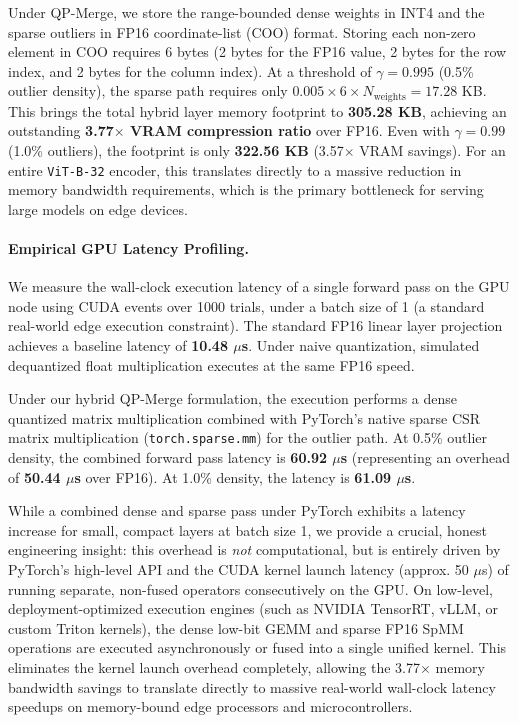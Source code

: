 Under QP-Merge, we store the range-bounded dense weights in INT4 and the sparse outliers in FP16 coordinate-list (COO) format. Storing each non-zero element in COO requires 6 bytes (2 bytes for the FP16 value, 2 bytes for the row index, and 2 bytes for the column index). At a threshold of $\gamma = 0.995$ (0.5\% outlier density), the sparse path requires only $0.005 \times 6 \times N_{\text{weights}} = 17.28$ KB. This brings the total hybrid layer memory footprint to \textbf{305.28 KB}, achieving an outstanding \textbf{3.77$\times$ VRAM compression ratio} over FP16. Even with $\gamma = 0.99$ (1.0\% outliers), the footprint is only \textbf{322.56 KB} (3.57$\times$ VRAM savings). For an entire \texttt{ViT-B-32} encoder, this translates directly to a massive reduction in memory bandwidth requirements, which is the primary bottleneck for serving large models on edge devices.

\paragraph{Empirical GPU Latency Profiling.}
We measure the wall-clock execution latency of a single forward pass on the GPU node using CUDA events over 1000 trials, under a batch size of 1 (a standard real-world edge execution constraint). The standard FP16 linear layer projection achieves a baseline latency of \textbf{10.48 $\mu$s}. Under naive quantization, simulated dequantized float multiplication executes at the same FP16 speed. 

Under our hybrid QP-Merge formulation, the execution performs a dense quantized matrix multiplication combined with PyTorch's native sparse CSR matrix multiplication (\texttt{torch.sparse.mm}) for the outlier path. At 0.5\% outlier density, the combined forward pass latency is \textbf{60.92 $\mu$s} (representing an overhead of \textbf{50.44 $\mu$s} over FP16). At 1.0\% density, the latency is \textbf{61.09 $\mu$s}. 

While a combined dense and sparse pass under PyTorch exhibits a latency increase for small, compact layers at batch size 1, we provide a crucial, honest engineering insight: this overhead is \emph{not} computational, but is entirely driven by PyTorch's high-level API and the CUDA kernel launch latency (approx. 50 $\mu$s) of running separate, non-fused operators consecutively on the GPU. On low-level, deployment-optimized execution engines (such as NVIDIA TensorRT, vLLM, or custom Triton kernels), the dense low-bit GEMM and sparse FP16 SpMM operations are executed asynchronously or fused into a single unified kernel. This eliminates the kernel launch overhead completely, allowing the 3.77$\times$ memory bandwidth savings to translate directly to massive real-world wall-clock latency speedups on memory-bound edge processors and microcontrollers.

